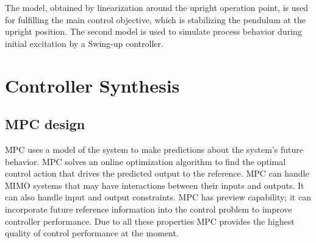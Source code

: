 The model, obtained by linearization around the upright operation point, is used for fulfilling the main control objective, which is stabilizing the pendulum at the upright position. The second model is used to simulate process behavior during initial excitation by a Swing-up controller.
\section{Controller Synthesis}
\subsection{MPC  design}
MPC uses a model of the system to make predictions about the system’s future behavior. MPC solves an online optimization algorithm to find the optimal control action that drives the predicted output to the reference. MPC can handle MIMO systems that may have interactions between their inputs and outputs. It can also handle input and output constraints. MPC has preview capability; it can incorporate future reference information into the control problem to improve controller performance. Due to all these properties MPC provides the highest quality of control performance at the moment.
